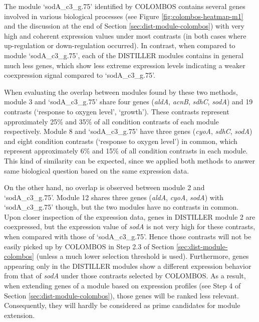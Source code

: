 The module `sodA\_c3\_g.75' identified by COLOMBOS contains several genes involved in various biological processes (see Figure \ref{fig:colombos-heatmap-m1} and the discussion at the end of Section \ref{sec:dist-module-colombos}) with very high and coherent expression values under most contrasts (in both cases where up-regulation or down-regulation occurred). In contrast, when compared to module `sodA\_c3\_g.75', each of the DISTILLER modules contains in general much less genes, which show less extreme expression levels indicating a weaker coexpression signal compared to `sodA\_c3\_g.75'.

When evaluating the overlap between modules found by these two methods, module 3 and `sodA\_c3\_g.75' share four genes (\textit{aldA}, \textit{acnB}, \textit{sdhC}, \textit{sodA}) and 19 contrasts (`response to oxygen level', `growth').  These contrasts represent approximately 25\% and 35\% of all condition contrasts of each module respectively. Module 8 and `sodA\_c3\_g.75' have three genes (\textit{cyoA}, \textit{sdhC}, \textit{sodA}) and eight condition contrasts (`response to oxygen level') in common, which represent approximately 6\% and 15\% of all condition contrasts in each module.  This kind of similarity can be expected, since we applied both methods to answer same biological question based on the same expression data.

On the other hand, no overlap is observed between module 2 and `sodA\_c3\_g.75'.  Module 12 shares three genes (\textit{aldA}, \textit{cyoA}, \textit{sodA}) with `sodA\_c3\_g.75' though, but the two modules have no contrasts in common.  Upon closer inspection of the expression data, genes in DISTILLER module 2 are coexpressed, but the expression value of \textit{sodA} is not very high for these contrasts, when compared with those of `sodA\_c3\_g.75'. Hence those contrasts will not be easily picked up by COLOMBOS in Step 2.3 of Section \ref{sec:dist-module-colombos} (unless a much lower selection threshold is used).  Furthermore, genes appearing only in the DISTILLER modules show a different expression behavior from that of \textit{sodA} under those contrasts selected by COLOMBOS.  As a result, when extending genes of a module based on expression profiles (see Step 4 of Section \ref{sec:dist-module-colombos}), those genes will be ranked less relevant. Consequently, they will hardly be considered as prime candidates for module extension.

